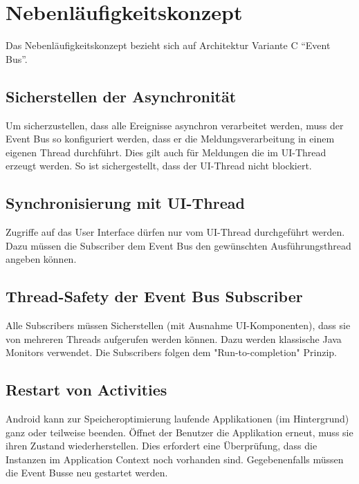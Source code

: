 \section{Nebenläufigkeitskonzept}
\label{sec:Nebenläufigkeitskonzept}
Das Nebenläufigkeitskonzept bezieht sich auf Architektur Variante C \enquote{Event Bus}.

\subsection{Sicherstellen der Asynchronität}
Um sicherzustellen, dass alle Ereignisse asynchron verarbeitet werden, muss der Event Bus so konfiguriert werden, dass er die Meldungsverarbeitung in einem eigenen Thread durchführt. Dies gilt auch für Meldungen die im \ac{UI}-Thread erzeugt werden. So ist sichergestellt, dass der \ac{UI}-Thread nicht blockiert.

\subsection{Synchronisierung mit \ac{UI}-Thread}
Zugriffe auf das User Interface dürfen nur vom UI-Thread durchgeführt werden. Dazu müssen die Subscriber dem Event Bus den gewünschten Ausführungsthread angeben können.

\subsection{Thread-Safety der Event Bus Subscriber}
Alle Subscribers müssen Sicherstellen (mit Ausnahme UI-Komponenten), dass sie von mehreren Threads aufgerufen werden können. Dazu werden klassische Java Monitors verwendet. Die Subscribers folgen dem "Run-to-completion" Prinzip.

\subsection{Restart von Activities}
Android kann zur Speicheroptimierung laufende Applikationen (im Hintergrund) ganz oder teilweise beenden. Öffnet der Benutzer die Applikation erneut, muss sie ihren Zustand wiederherstellen. Dies erfordert eine Überprüfung, dass die Instanzen im Application Context noch vorhanden sind. Gegebenenfalls müssen die Event Busse neu gestartet werden.